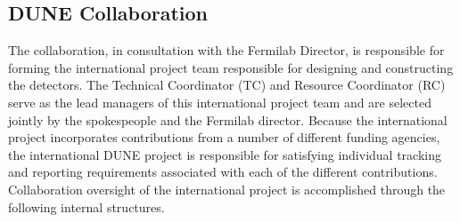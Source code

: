 \subsection{DUNE Collaboration}	

	The collaboration, in consultation with the Fermilab Director, is responsible for forming the international project team responsible for designing and constructing the detectors.  The Technical Coordinator (TC) and Resource Coordinator (RC) serve as the lead managers of this international project team and are selected jointly by the spokespeople and the Fermilab director.  Because the international project incorporates contributions from a number of different funding agencies, the international DUNE project is responsible for satisfying individual tracking and reporting requirements associated with each of the different contributions.  Collaboration oversight of the international project is accomplished through the following internal structures.


